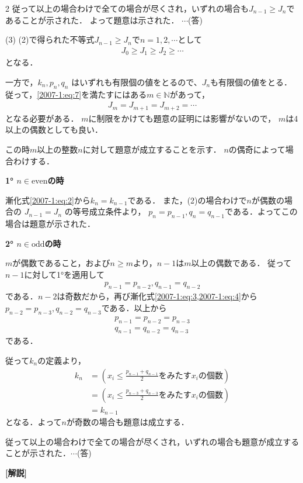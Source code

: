 \documentclass[../../../../main.tex]{subfiles}
\begin{document}
\begin{multicols}{2}
  \vspace{5pt}
  従って以上の場合わけで全ての場合が尽くされ，いずれの場合も$J_{n-1}\ge J_{n}$であることが示された．
  よって題意は示された．  $\cdots$(答)
  \vspace{10pt}


  (3)
  (2)で得られた不等式$J_{n-1} \ge J_{n}$で$n=1,2,\cdots$として
  \begin{align}
    J_0 \ge J_1 \ge J_2 \ge \cdots \label{2007-1:eq:7}
  \end{align}
  となる．

  一方で，$k_n, p_n, q_n$ はいずれも有限個の値をとるので、$J_n$も有限個の値をとる．
  従って，\cref{2007-1:eq:7}を満たすにはある$m \in \mathbb{N}$があって，
  \begin{align*}
    J_m = J_{m+1} = J_{m+2} = \cdots
  \end{align*}
  となる必要がある．
  $m$に制限をかけても題意の証明には影響がないので，
  $m$は4以上の偶数としても良い．

  この時$m$以上の整数$n$に対して題意が成立することを示す．
  $n$の偶奇によって場合わけする．

  \vspace{5pt}
  \textbf{1° $n\in \text{even}$の時}

  漸化式\cref{2007-1:eq:2}から$k_n=k_{n-1}$である．
  また，(2)の場合わけで$n$が偶数の場合の $J_{n-1}=J_n$ の等号成立条件より，
  $p_n=p_{n-1}, q_n=q_{n-1}$である．よってこの場合は題意が示された．

  \vspace{5pt}
  \textbf{2° $n\in \text{odd}$の時}

  $m$が偶数であること，および$n \ge m$より，$n-1$は$m$以上の偶数である．
  従って$n-1$に対して1°を適用して
  \begin{align*}
    p_{n-1}=p_{n-2}, q_{n-1}=q_{n-2}
  \end{align*}
  である．$n-2$は奇数だから，再び漸化式\cref{2007-1:eq:3,2007-1:eq:4}から
  $p_{n-2}=p_{n-3}, q_{n-2}=q_{n-3}$である．以上から
  \begin{align*}
    p_{n-1} = p_{n-2} = p_{n-3} \\
    q_{n-1} = q_{n-2} = q_{n-3}
  \end{align*}
  である．

  従って$k_n$の定義より，
  \begin{align*}
    k_n & = \left( x_i \le \frac{p_{n-1}+q_{n-1}}{2} \text{をみたす} x_i \text{の個数} \right) \\
        & = \left( x_i \le \frac{p_{n-3}+q_{n-3}}{2} \text{をみたす} x_i \text{の個数} \right) \\
        & = k_{n-1}
  \end{align*}
  となる．よって$n$が奇数の場合も題意は成立する．

  従って以上の場合わけで全ての場合が尽くされ，いずれの場合も題意が成立することが示された．$\cdots$(答)
  \vspace{10pt}


  {\bf[解説]}



  \newpage
\end{multicols}
\end{document}
